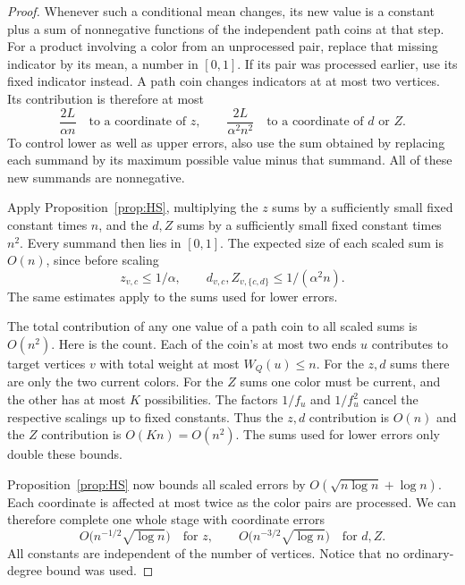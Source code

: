 \documentclass[11pt]{article}
\theoremstyle{definition}\newtheorem{algorithm}{Algorithm}[section]
\numberwithin{equation}{section}
\theoremstyle{remark}\newtheorem*{remark}{Remark}
\begin{document}
\begin{proof}
Whenever such a conditional mean changes, its new value is a constant
plus a sum of nonnegative functions of the independent path coins at
that step. For a product involving a color from an unprocessed pair,
replace that missing indicator by its mean, a number in $[0,1]$. If its
pair was processed earlier, use its fixed indicator instead. A path coin
changes indicators at at most two vertices. Its contribution is therefore
at most
\[
 \frac{2L}{\alpha n}\quad\text{to a coordinate of }z,
 \qquad
 \frac{2L}{\alpha^2n^2}\quad\text{to a coordinate of }d\text{ or }Z.
\]
To control lower as well as upper errors, also use the sum obtained by
replacing each summand by its maximum possible value minus that summand.
All of these new summands are nonnegative.

Apply Proposition~\ref{prop:HS}, multiplying the $z$ sums by a sufficiently
small fixed constant times $n$, and the $d,Z$ sums by a sufficiently small
fixed constant times $n^2$. Every summand then lies in $[0,1]$. The
expected size of each scaled sum is $O(n)$, since before scaling
\[
 z_{v,c}\le 1/\alpha,\qquad
 d_{v,c},Z_{v,\{c,d\}}\le1/(\alpha^2n).
\]
The same estimates apply to the sums used for lower errors.

The total contribution of any one value of a path coin to all scaled
sums is $O(n^2)$. Here is the count. Each of the coin's at most two ends
$u$ contributes to target vertices $v$ with total weight at most
$W_Q(u)\le n$. For the $z,d$ sums there are only the two current colors.
For the $Z$ sums one color must be current, and the other has at most
$K$ possibilities. The factors $1/f_u$ and $1/f_u^2$ cancel the respective
scalings up to fixed constants. Thus the $z,d$ contribution is $O(n)$ and
the $Z$ contribution is $O(Kn)=O(n^2)$. The sums used for lower errors
only double these bounds.

Proposition~\ref{prop:HS} now bounds all scaled errors by
$O(\sqrt{n\log n}+\log n)$. Each coordinate is affected at most twice
as the color pairs are processed. We can therefore complete one whole
stage with coordinate errors
\[
 O\bigl(n^{-1/2}\sqrt{\log n}\bigr)\quad\text{for }z,
 \qquad
 O\bigl(n^{-3/2}\sqrt{\log n}\bigr)\quad\text{for }d,Z.
\]
All constants are independent of the number of vertices. Notice that
no ordinary-degree bound was used.


\end{proof}
\end{document}
